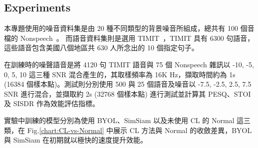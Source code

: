 \documentclass[10pt,twocolumn,letterpaper]{article}
\begin{document}
\begin{CJK}{UTF8}{bkai}
   \section{Experiments}
   本專題使用的噪音資料集是由 20 種不同類型的背景噪音所組成，總共有 100 個音檔的 Nonspeech~\cite{Nonspeech}。
   而語音資料集則是選用 TIMIT~\cite{TIMIT}，TIMIT 具有 6300 句語音，這些語音包含美國八個地區共 630 人所念出的 10
   個指定句子。

   在訓練時的噪聲語音是將 4120 句 TIMIT 語音與 75 個 Nonspeech 雜訊以 -10, -5, 0, 5, 10 這三種 SNR
   混合產生的，其取樣頻率為 16K Hz，擷取時間約為 1s (16384 個樣本點)。測試則分別使用 500 與 25 個語音及噪音以 -7.5,
   -2.5, 2.5, 7.5 SNR 進行混合，並擷取約 2s (32768 個樣本點) 進行測試並計算其 PESQ\cite{PESQ}、STOI\cite{STOI} 及 SISDR\cite{SISDR}
   作為效能評估指標。

   實驗中訓練的模型分別為使用 BYOL、SimSiam 以及未使用 CL 的 Normal 這三類，在 Fig.\ref{chart:CL-vs-Normal}
   中展示 CL 方法與 Normal 的收斂差異，BYOL 與 SimSiam 在初期就以極快的速度提升效能。


\end{CJK}
\end{document}
